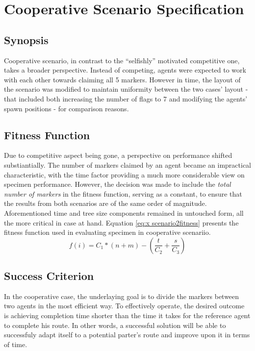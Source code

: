 \section{Cooperative Scenario Specification}
\subsection{Synopsis}
Cooperative scenario, in contrast to the ``selfishly'' motivated competitive one, takes a broader perspective. Instead of competing, agents were expected to work with each other towards claiming all 5 markers. However in time, the layout of the scenario was modified to maintain uniformity between the two cases' layout - that included both increasing the number of flags to 7 and modifying the agents' spawn positions - for comparison reasons.
\subsection{Fitness Function}
Due to competitive aspect being gone, a perspective on performance shifted substiantially. The number of markers claimed by an agent became an impractical characteristic, with the time factor providing a much more considerable view on specimen performance. However, the decision was made to include the \textit{total number of markers} in the fitness function, serving as a constant, to ensure that the results from both scenarios are of the same order of magnitude. Aforementioned time and tree size components remained in untouched form, all the more critical in case at hand. Equation \ref{eq:x scenario2fitness} presents the fitness function used in evaluating specimen in cooperative scenariio.
\begin{equation}
    \label{eq:x scenario2fitness}
f(i) = C_1 * (n + m) - (\frac{t}{C_2} + \frac{s}{C_3})
\end{equation} %

\subsection{Success Criterion}
In the cooperative case, the underlaying goal is to divide the markers between two agents in the most efficient way. To effectively operate, the desired outcome is achieving completion time shorter than the time it takes for the reference agent to complete his route. In other words, a successful solution will be able to successfuly adapt itself to a potential parter's route and improve upon it in terms of time.

